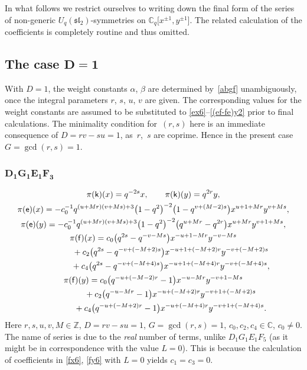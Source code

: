 \documentclass[pdftex]{sigma}
\numberwithin{equation}{section}
\begin{document}
In what follows we restrict ourselves to writing down the final form of the series of non-generic $U_q(\mathfrak{sl}_2)$-symmetries on $\mathbb{C}_q\big[x^{\pm 1},y^{\pm 1}\big]$. The related calculation of the coefficients is completely routine and thus omitted.

\subsection[The case $D=1$]{The case $\boldsymbol{D=1}$}

With $D=1$, the weight constants $\alpha$, $\beta$ are determined by~\eqref{abgf} unambiguously, once the integral parameters $r$, $s$, $u$, $v$ are given. The corresponding values for the weight constants are assumed to be substituted to \eqref{ex6}--\eqref{(ef-fe)y2} prior to final calculations. The minimality condition for~$(r,s)$ here is an immediate consequence of $D=rv-su=1$, as~$r$,~$s$ are coprime. Hence in the present case $G=\operatorname{gcd}(r,s)=1$.

\subsubsection*{$\boldsymbol{D_1G_1E_1F_3}$}
\begin{gather*}
\pi(\mathsf{k})(x)= q^{-2s}x,\qquad\pi(\mathsf{k})(y)=q^{2r}y, \\
\pi(\mathsf{e})(x)=-c_0^{-1}q^{(u+Mr)(v+Ms)+3}\big(1-q^2\big)^{-2}\big(1-q^{v+(M-2)s}\big)x^{u+1+Mr}y^{v+Ms},\\
\pi(\mathsf{e})(y)=-c_0^{-1}q^{(u+Mr)(v+Ms)+3}\big(1-q^2\big)^{-2}\big(q^{u+Mr}-q^{2r}\big)x^{u+Mr}y^{v+1+Ms}, \\
\pi(\mathsf{f})(x)=c_0\big(q^{2s}-q^{-v-Ms}\big)x^{-u+1-Mr}y^{-v-Ms}\\
\hphantom{\pi(\mathsf{f})(x)=}{}+ c_2\big(q^{2s}-q^{-v+(-M+2)s}\big)x^{-u+1+(-M+2)r}y^{-v+(-M+2)s}\\
\hphantom{\pi(\mathsf{f})(x)=}{}+ c_4\big(q^{2s}-q^{-v+(-M+4)s}\big)x^{-u+1+(-M+4)r}y^{-v+(-M+4)s}, \\
\pi(\mathsf{f})(y)=c_0\big(q^{-u+(-M-2)r}-1\big)x^{-u-Mr}y^{-v+1-Ms}\\
\hphantom{\pi(\mathsf{f})(y)=}{}+ c_2\big(q^{-u-Mr}-1\big)x^{-u+(-M+2)r}y^{-v+1+(-M+2)s}\\
\hphantom{\pi(\mathsf{f})(y)=}{}+c_4\big(q^{-u+(-M+2)r}-1\big)x^{-u+(-M+4)r}y^{-v+1+(-M+4)s}.
\end{gather*}
Here $r,s,u,v,M\in\mathbb{Z}$, $D=rv-su=1$, $G=\operatorname{gcd}(r,s)=1$, $c_0,c_2,c_4\in\mathbb{C}$, $c_0\ne 0$. The name of series is due to the {\it real} number of terms, unlike $D_1G_1E_1F_5$ (as it might be in correspondence with the value $L=0$). This is because the calculation of coefficients in \eqref{fx6}, \eqref{fy6} with $L=0$ yields $c_1=c_3=0$.
\end{document}
